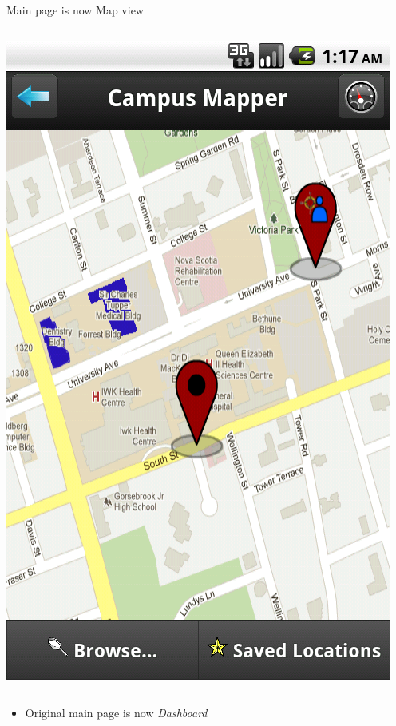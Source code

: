 \documentclass{beamer}
\begin{document}
\begin{frame}{Main page is now Map view}
\begin{columns}[c]
        \center\includegraphics[height=0.5 \textheight]{post-heuristic/map-blank.png}
    \end{columns}
    \begin{itemize}
        \item Original main page is now \emph{Dashboard}
    \end{itemize}
\end{frame}
\end{document}
